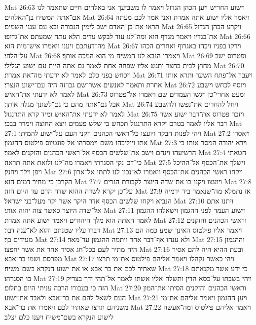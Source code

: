 Mat 26:63  וישוע החריש ויען הכהן הגדול ויאמר לו משביעך אני באלהים חיים שתאמר לנו אם־אתה המשיח בן־האלהים׃
Mat 26:64  ויאמר אליו ישוע אתה אמרת ואני אמר לכם מעתה תראו את־בן־האדם ישב לימין הגבורה ובא עם־ענני השמים׃
Mat 26:65  ויקרע הכהן הגדול את־בגדיו ויאמר מגדף הוא ומה־לנו עוד לבקש עדים הלא עתה שמעתם את־גדופו׃
Mat 26:66  מה־דעתכם ויענו ויאמרו איש־מות הוא׃
Mat 26:67  וירקו בפניו ויכהו באגרוף ואחרים הכהו על־הלחי׃
Mat 26:68  ויאמרו הנבא לנו המשיח מי הוא המכה אותך׃
Mat 26:69  ופטרוס ישב מחוץ לבית בחצר ותגש אליו שפחה אחת לאמר גם־אתה היית עם־ישוע הגלילי׃
Mat 26:70  ויכחש בפני כלם לאמר לא ידעתי מה־את אמרת׃
Mat 26:71  ויעבר אל־פתח השער ותרא אותו אחרת ותאמר לאנשים אשר־שם גם־זה היה עם־ישוע הנצרי׃
Mat 26:72  ויוסף לכחש וישבע לאמר לא ידעתי את־האיש׃
Mat 26:73  ומעט אחרי־כן ויגשו העמדים שם ויאמרו אל־פטרוס אבל גם־אתה מהם כי גם־לשונך מגלה אותך׃
Mat 26:74  ויחל להחרים את־נפשו ולהשבע לאמר לא ידעתי את־האיש ומיד קרא התרנגול׃
Mat 26:75  ויזכר פטרוס את־דבר ישוע אשר דבר אליו לאמר בטרם יקרא התרנגול תכחש בי שלש פעמים ויצא החוצה וימרר בבכי׃
Mat 27:1  ויהי לפנות הבקר ויועצו כל־ראשי הכהנים וזקני העם על־ישוע להמיתו׃
Mat 27:2  ויאסרו אתו ויוליכהו משם וימסרהו אל־פונטיוס פילטוס ההגמון׃
Mat 27:3  וירא יהודה המסר אותו כי הרשיעהו וינחם וישב את־שלשים הכסף אל־ראשי הכהנים והזקנים לאמר׃
Mat 27:4  חטאתי כי־דם נקי הסגרתי ויאמרו מה־לנו ולזאת אתה תראה׃
Mat 27:5  וישלך את־הכסף אל־ההיכל ויפן וילך ויחנק׃
Mat 27:6  ויקחו ראשי הכהנים את־הכסף ויאמרו לא־נכון לנו לתתו אל־ארון הקרבן כי־מחיר דמים הוא׃
Mat 27:7  ויועצו ויקנו־בו את־שדה היוצר לקבורת הגרים׃
Mat 27:8  על־כן יקרא לשדה ההוא שדה הדם עד היום הזה׃
Mat 27:9  אז נתמלא מה־שנאמר ביד ירמיה הנביא ויקחו שלשים הכסף אדר היקר אשר יקר מעל־בני ישראל׃
Mat 27:10  ויתנו אתם אל־שדה היוצר כאשר צוה יהוה אותי׃
Mat 27:11  וישוע העמד לפני ההגמון וישאלהו ההגמון לאמר האתה הוא מלך היהודים ויאמר ישוע אתה אמרת׃
Mat 27:12  וראשי הכהנים והזקנים דברו עליו שטנתם והוא לא־ענה דבר׃
Mat 27:13  ויאמר אליו פילטוס האינך שמע כמה הם מעידים בך׃
Mat 27:14  ולא ענהו אף־דבר אחד ויתמה ההגמון עד־מאד׃
Mat 27:15  וההגמון היה מתיר לעם בכל־חג אסיר אחד את אשר יחפצו׃
Mat 27:16  ובעת ההיא היה להם אסיר מפרסם ושמו בר־אבא׃
Mat 27:17  ויהי כאשר נקהלו ויאמר אליהם פילטוס את־מי תרצו שאתיר לכם את בר־אבא או את־ישוע הנקרא בשם־משיח׃
Mat 27:18  כי ידע אשר מקנאתם בו הסגרהו׃
Mat 27:19  ויהי בשבתו על־כסא הדין ותשלח אליו אשתו לאמר אל־תהי ידך בצדיק הזה כי בעבורו הרבה עניתי היום בחלום׃
Mat 27:20  וראשי הכהנים והזקנים הסיתו את־המון העם לשאל להם את בר־אבא ולאבד את־ישוע׃
Mat 27:21  ויען ההגמון ויאמר אליהם את־מי משניהם תרצו שאתיר לכם ויאמרו את בר־אבא׃
Mat 27:22  ויאמר אליהם פילטוס ומה־אעשה לישוע הנקרא בשם־משיח ויענו כלם יצלב׃
